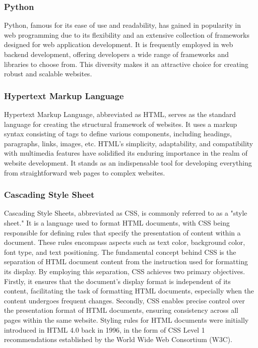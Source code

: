 \documentclass[12pt,oneside,openright,a4paper]{cpe-english-project}
\begin{document}
    \subsubsection{Python}
      \qquad Python, famous for its ease of use and readability, has gained in popularity in web programming due to its flexibility and an extensive collection of frameworks designed for web application development. It is frequently employed in web backend development, offering developers a wide range of frameworks and libraries to choose from. This diversity makes it an attractive choice for creating robust and scalable websites.\par

    \subsubsection{Hypertext Markup Language}
      \qquad Hypertext Markup Language, abbreviated as HTML, serves as the standard language for creating the structural framework of websites. It uses a markup syntax consisting of tags to define various components, including headings, paragraphs, links, images, etc. HTML’s simplicity, adaptability, and compatibility with multimedia features have solidified its enduring importance in the realm of website development. It stands as an indispensable tool for developing everything from straightforward web pages to complex websites.\par

    \subsubsection{Cascading Style Sheet}
      \qquad Cascading Style Sheets, abbreviated as CSS, is commonly referred to as a "style sheet." It is a language used to format HTML documents, with CSS being responsible for defining rules that specify the presentation of content within a document. These rules encompass aspects such as text color, background color, font type, and text positioning. The fundamental concept behind CSS is the separation of HTML document content from the instruction used for formatting its display. By employing this separation, CSS achieves two primary objectives. Firstly, it ensures that the document's display format is independent of its content, facilitating the task of formatting HTML documents, especially when the content undergoes frequent changes. Secondly, CSS enables precise control over the presentation format of HTML documents, ensuring consistency across all pages within the same website. Styling rules for HTML documents were initially introduced in HTML 4.0 back in 1996, in the form of CSS Level 1 recommendations established by the World Wide Web Consortium (W3C).\par
\end{document}
